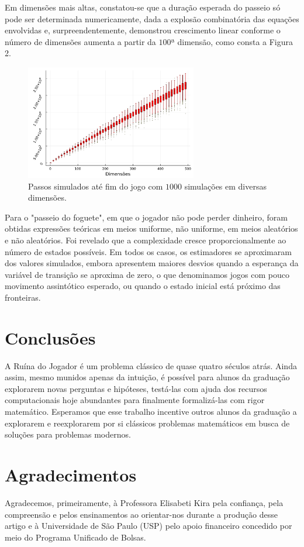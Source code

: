 \documentclass[a4paper,10pt,twocolumn]{article}
\begin{document}
Em dimensões mais altas, constatou-se que a duração esperada do
passeio só pode ser determinada numericamente, dada a explosão combinatória das
equações envolvidas e, surpreendentemente, demonstrou crescimento linear
conforme o número de dimensões aumenta a partir da $100$ª dimensão, como consta a
Figura 2.

\begin{figure}[h]
    \caption{Passos simulados até fim do jogo com $1000$ simulações em diversas
    dimensões.}
    \centering
    \includegraphics[width=7.5cm]{"boxplots.pdf"}
\end{figure}

Para o "passeio do foguete", em que o jogador não pode perder
dinheiro, foram obtidas expressões teóricas em meios uniforme, não uniforme, em
meios aleatórios e não aleatórios. Foi revelado que a complexidade cresce
proporcionalmente ao número de estados possíveis. Em todos os casos, os
estimadores se aproximaram dos valores simulados, embora apresentem maiores
desvios quando a esperança da variável de transição se aproxima de zero, o que
denominamos jogos com pouco movimento assintótico esperado, ou quando o estado
inicial está próximo das fronteiras.

\section{Conclusões}

A Ruína do Jogador é um problema clássico de quase quatro séculos atrás. Ainda
assim, mesmo munidos apenas da intuição, é possível para alunos da graduação
explorarem novas perguntas e hipóteses, testá-las com ajuda dos recursos
computacionais hoje abundantes para finalmente formalizá-las com rigor
matemático. Esperamos que esse trabalho incentive outros alunos da graduação a
explorarem e reexplorarem por si clássicos problemas matemáticos em busca de
soluções para problemas modernos.

\section{Agradecimentos}

Agradecemos, primeiramente, à Professora Elisabeti Kira pela confiança, pela
compreensão e pelos ensinamentos ao orientar-nos durante a produção desse artigo
e à Universidade de São Paulo (USP) pelo apoio financeiro concedido por meio do
Programa Unificado de Bolsas.

\vspace{0.5cm}


\end{document}
